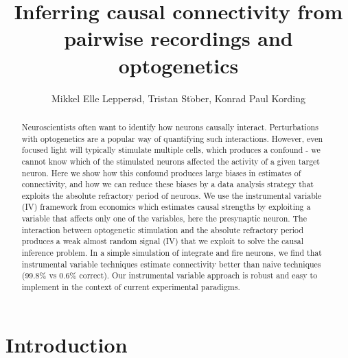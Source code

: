 \documentclass[11pt]{article}
\title{Inferring causal connectivity from pairwise recordings and optogenetics}
\author{Mikkel Elle Lepper\o{}d, Tristan St$\ddot{\text{o}}$ber, Konrad Paul Kording}
\begin{document}
 \maketitle

\begin{abstract}
\noindent Neuroscientists often want to identify how neurons causally interact. Perturbations with optogenetics are a popular way of quantifying such interactions. However, even focused light will typically stimulate multiple cells, which produces a confound - we cannot know which of the stimulated neurons affected the activity of a given target neuron. Here we show how this confound produces large biases in estimates of connectivity, and how we can reduce these biases by a data analysis strategy that exploits the absolute refractory period of neurons. We use the instrumental variable (IV) framework from economics which estimates causal strengths by exploiting a variable that affects only one of the variables, here the presynaptic neuron. The interaction between optogenetic stimulation and the absolute refractory period produces a weak almost random signal (IV) that we exploit to solve the causal inference problem. In a simple simulation of integrate and fire neurons, we find that instrumental variable techniques estimate connectivity better than naive techniques (99.8\% vs 0.6\% correct). Our instrumental variable approach is robust and easy to implement in the context of current experimental paradigms.
\end{abstract} 

\section{Introduction}
\end{document}
